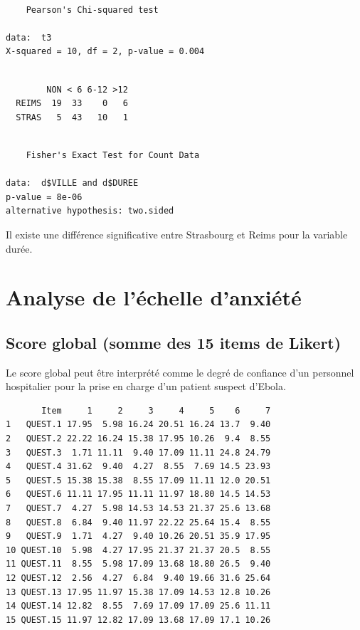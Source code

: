 \documentclass[]{article}
\begin{document}
\begin{verbatim}

    Pearson's Chi-squared test

data:  t3
X-squared = 10, df = 2, p-value = 0.004
\end{verbatim}

\begin{verbatim}
       
        NON < 6 6-12 >12
  REIMS  19  33    0   6
  STRAS   5  43   10   1
\end{verbatim}

\begin{verbatim}

    Fisher's Exact Test for Count Data

data:  d$VILLE and d$DUREE
p-value = 8e-06
alternative hypothesis: two.sided
\end{verbatim}

Il existe une différence significative entre Strasbourg et Reims pour la
variable durée.

\section{Analyse de l'échelle
d'anxiété}\label{analyse-de-lechelle-danxiete}

\subsection{Score global (somme des 15 items de
Likert)}\label{score-global-somme-des-15-items-de-likert}

Le score global peut être interprété comme le degré de confiance d'un
personnel hospitalier pour la prise en charge d'un patient suspect
d'Ebola.

\begin{verbatim}
       Item     1     2     3     4     5    6     7
1   QUEST.1 17.95  5.98 16.24 20.51 16.24 13.7  9.40
2   QUEST.2 22.22 16.24 15.38 17.95 10.26  9.4  8.55
3   QUEST.3  1.71 11.11  9.40 17.09 11.11 24.8 24.79
4   QUEST.4 31.62  9.40  4.27  8.55  7.69 14.5 23.93
5   QUEST.5 15.38 15.38  8.55 17.09 11.11 12.0 20.51
6   QUEST.6 11.11 17.95 11.11 11.97 18.80 14.5 14.53
7   QUEST.7  4.27  5.98 14.53 14.53 21.37 25.6 13.68
8   QUEST.8  6.84  9.40 11.97 22.22 25.64 15.4  8.55
9   QUEST.9  1.71  4.27  9.40 10.26 20.51 35.9 17.95
10 QUEST.10  5.98  4.27 17.95 21.37 21.37 20.5  8.55
11 QUEST.11  8.55  5.98 17.09 13.68 18.80 26.5  9.40
12 QUEST.12  2.56  4.27  6.84  9.40 19.66 31.6 25.64
13 QUEST.13 17.95 11.97 15.38 17.09 14.53 12.8 10.26
14 QUEST.14 12.82  8.55  7.69 17.09 17.09 25.6 11.11
15 QUEST.15 11.97 12.82 17.09 13.68 17.09 17.1 10.26
\end{verbatim}
\end{document}
